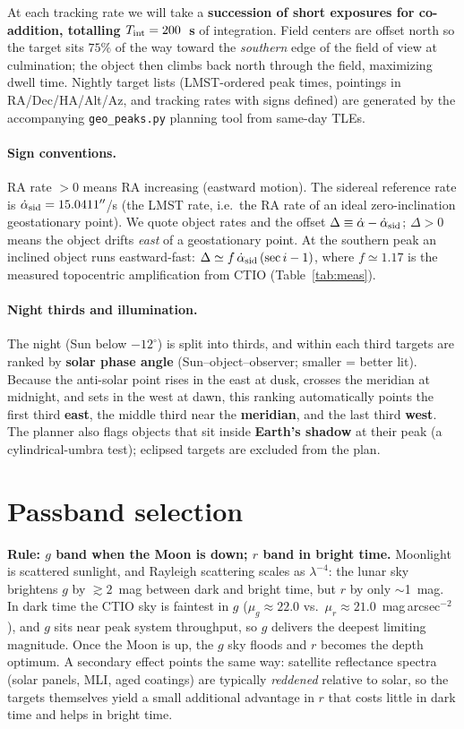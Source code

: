 \documentclass[11pt]{article}
\newcommand{\arcsecs}{\ensuremath{''}}
\begin{document}
At each tracking rate we will take a \textbf{succession of short exposures for
co-addition, totalling $T_{\rm int} = 200$~s} of integration. Field centers are offset
north so the target sits $75\%$ of the way toward the \emph{southern} edge of the field
of view at culmination; the object then climbs back north through the field, maximizing
dwell time. Nightly target lists (LMST-ordered peak times, pointings in RA/Dec/HA/Alt/Az,
and tracking rates with signs defined) are generated by the accompanying
\texttt{geo\_peaks.py} planning tool from same-day TLEs.

\paragraph{Sign conventions.} RA rate $>0$ means RA increasing (eastward motion).
The sidereal reference rate is $\dot\alpha_{\rm sid}=15.0411\arcsecs$/s (the LMST rate,
i.e.\ the RA rate of an ideal zero-inclination geostationary point). We quote object
rates and the offset $\Delta \equiv \dot\alpha - \dot\alpha_{\rm sid}$; $\Delta>0$ means
the object drifts \emph{east} of a geostationary point. At the southern peak an inclined
object runs eastward-fast: $\Delta \simeq f\,\dot\alpha_{\rm sid}\,(\sec i - 1)$, where
$f\simeq1.17$ is the measured topocentric amplification from CTIO (Table~\ref{tab:meas}).

\paragraph{Night thirds and illumination.} The night (Sun below $-12^{\circ}$) is split
into thirds, and within each third targets are ranked by \textbf{solar phase angle}
(Sun--object--observer; smaller = better lit). Because the anti-solar point rises in the
east at dusk, crosses the meridian at midnight, and sets in the west at dawn, this ranking
automatically points the first third \textbf{east}, the middle third near the
\textbf{meridian}, and the last third \textbf{west}. The planner also flags objects that
sit inside \textbf{Earth's shadow} at their peak (a cylindrical-umbra test); eclipsed
targets are excluded from the plan.

\section{Passband selection}
\label{sec:band}

\textbf{Rule: $g$ band when the Moon is down; $r$ band in bright time.}
Moonlight is scattered sunlight, and Rayleigh scattering scales as $\lambda^{-4}$: the
lunar sky brightens $g$ by $\gtrsim 2$~mag between dark and bright time, but $r$ by only
$\sim$1~mag. In dark time the CTIO sky is faintest in $g$
($\mu_g \approx 22.0$ vs.\ $\mu_r \approx 21.0$~mag\,arcsec$^{-2}$), and $g$ sits near
peak system throughput, so $g$ delivers the deepest limiting magnitude. Once the Moon is
up, the $g$ sky floods and $r$ becomes the depth optimum. A secondary effect points the
same way: satellite reflectance spectra (solar panels, MLI, aged coatings) are typically
\emph{reddened} relative to solar, so the targets themselves yield a small additional
advantage in $r$ that costs little in dark time and helps in bright time.
\end{document}
